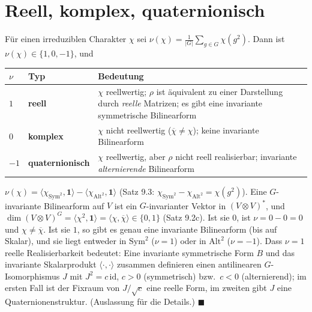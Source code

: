 \section{Reell, komplex, quaternionisch}

\begin{merksatz}
Für einen irreduziblen Charakter $\chi$ sei $\nu(\chi) = \frac1{|G|}\sum_{g\in G}\chi(g^{2})$. Dann ist $\nu(\chi)\in\{1, 0, -1\}$, und
\begin{center}
{\small
\renewcommand{\arraystretch}{1.5}
\begin{tabular}{@{}P{0.9cm}P{2.3cm}P{5.6cm}@{}}
\toprule
$\nu$ & Typ & Bedeutung\\
\midrule
$1$ & \textbf{reell} & $\chi$ reellwertig; $\rho$ ist äquivalent zu einer Darstellung durch \emph{reelle} Matrizen; es gibt eine invariante symmetrische Bilinearform\\
$0$ & \textbf{komplex} & $\chi$ nicht reellwertig ($\overline\chi\neq\chi$); keine invariante Bilinearform\\
$-1$ & \textbf{quater\-nionisch} & $\chi$ reellwertig, aber $\rho$ nicht reell realisierbar; invariante \emph{alternierende} Bilinearform\\
\bottomrule
\end{tabular}}
\end{center}

$\nu(\chi) = \langle\chi_{\mathrm{Sym}^{2}}, \mathbf 1\rangle - \langle\chi_{\mathrm{Alt}^{2}}, \mathbf 1\rangle$ (Satz 9.3: $\chi_{\mathrm{Sym}^{2}} - \chi_{\mathrm{Alt}^{2}} = \chi(g^{2})$). Eine $G$-invariante Bilinearform auf $V$ ist ein $G$-invarianter Vektor in $(V\otimes V)^{*}$, und $\dim(V\otimes V)^{G} = \langle\chi^{2}, \mathbf 1\rangle = \langle\chi, \overline\chi\rangle\in\{0, 1\}$ (Satz 9.2c). Ist sie $0$, ist $\nu = 0 - 0 = 0$ und $\chi\neq\overline\chi$. Ist sie $1$, so gibt es genau eine invariante Bilinearform (bis auf Skalar), und sie liegt entweder in $\mathrm{Sym}^{2}$ ($\nu = 1$) oder in $\mathrm{Alt}^{2}$ ($\nu = -1$). Dass $\nu = 1$ reelle Realisierbarkeit bedeutet: Eine invariante symmetrische Form $B$ und das invariante Skalarprodukt $\langle\cdot, \cdot\rangle$ zusammen definieren einen antilinearen $G$-Isomorphismus $J$ mit $J^{2} = c\,\mathrm{id}$, $c > 0$ (symmetrisch) bzw.\ $c < 0$ (alternierend); im ersten Fall ist der Fixraum von $J/\sqrt c$ eine reelle Form, im zweiten gibt $J$ eine Quaternionenstruktur. (Auslassung für die Details.) $\blacksquare$


\end{merksatz}

